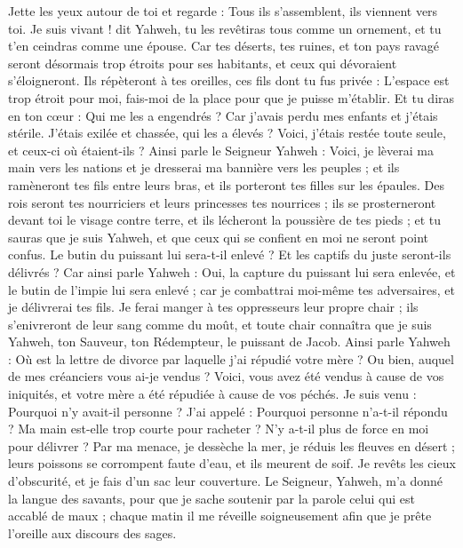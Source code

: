 \begin{multicols}{2}
Jette les yeux autour de toi et regarde : Tous ils s'assemblent, ils viennent vers toi. Je suis vivant ! dit Yahweh, tu les revêtiras tous comme un ornement, et tu t'en ceindras comme une épouse.
Car tes déserts, tes ruines, et ton pays ravagé seront désormais trop étroits pour ses habitants, et ceux qui dévoraient s'éloigneront.
Ils répèteront à tes oreilles, ces fils dont tu fus privée : L'espace est trop étroit pour moi, fais-moi de la place pour que je puisse m'établir.
Et tu diras en ton cœur : Qui me les a engendrés ? Car j'avais perdu mes enfants et j'étais stérile. J'étais exilée et chassée, qui les a élevés ? Voici, j'étais restée toute seule, et ceux-ci où étaient-ils ?
Ainsi parle le Seigneur Yahweh : Voici, je lèverai ma main vers les nations et je dresserai ma bannière vers les peuples ; et ils ramèneront tes fils entre leurs bras, et ils porteront tes filles sur les épaules.
Des rois seront tes nourriciers et leurs princesses tes nourrices ; ils se prosterneront devant toi le visage contre terre, et ils lécheront la poussière de tes pieds ; et tu sauras que je suis Yahweh, et que ceux qui se confient en moi ne seront point confus.
Le butin du puissant lui sera-t-il enlevé ? Et les captifs du juste seront-ils délivrés ?
Car ainsi parle Yahweh : Oui, la capture du puissant lui sera enlevée, et le butin de l'impie lui sera enlevé ; car je combattrai moi-même tes adversaires, et je délivrerai tes fils.
Je ferai manger à tes oppresseurs leur propre chair ; ils s'enivreront de leur sang comme du moût, et toute chair connaîtra que je suis Yahweh, ton Sauveur, ton Rédempteur, le puissant de Jacob.
\VerseOne{}Ainsi parle Yahweh : Où est la lettre de divorce par laquelle j'ai répudié votre mère ? Ou bien, auquel de mes créanciers vous ai-je vendus ? Voici, vous avez été vendus à cause de vos iniquités, et votre mère a été répudiée à cause de vos péchés.
Je suis venu : Pourquoi n'y avait-il personne ? J'ai appelé : Pourquoi personne n'a-t-il répondu ? Ma main est-elle trop courte pour racheter ? N'y a-t-il plus de force en moi pour délivrer ? Par ma menace, je dessèche la mer, je réduis les fleuves en désert ; leurs poissons se corrompent faute d'eau, et ils meurent de soif.
Je revêts les cieux d'obscurité, et je fais d'un sac leur couverture.
Le Seigneur, Yahweh, m'a donné la langue des savants, pour que je sache soutenir par la parole celui qui est accablé de maux ; chaque matin il me réveille soigneusement afin que je prête l'oreille aux discours des sages.

\end{multicols}
